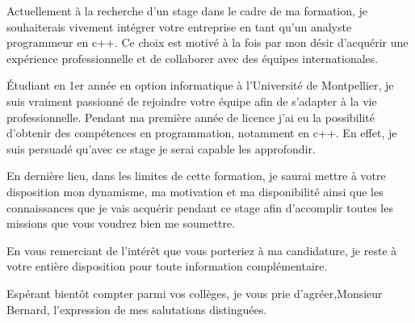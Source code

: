 \documentclass[11pt,a4paper,sans]{moderncv}
\begin{document}
Actuellement à la recherche d’un stage dans le cadre de ma formation, je souhaiterais vivement intégrer votre entreprise en tant qu’un analyste programmeur en c++. Ce choix est motivé à la fois par mon désir d’acquérir une expérience professionnelle et de collaborer avec des équipes internationales. 

Étudiant en 1er année en option informatique à l’Université de Montpellier, je suis vraiment passionné de rejoindre votre équipe afin de s’adapter à la vie professionnelle. Pendant ma première année de licence j’ai eu la possibilité d’obtenir des compétences en programmation, notamment en c++. En effet, je suis persuadé qu’avec ce stage je serai capable les approfondir.

En dernière lieu, dans les limites de cette formation, je saurai mettre à votre disposition mon dynamisme, ma motivation et ma disponibilité ainsi que les connaissances que je vais acquérir pendant ce stage afin d’accomplir toutes les missions que vous voudrez bien me soumettre.

En vous remerciant de l’intérêt que vous porteriez à ma candidature, je reste à votre entière disposition pour toute information complémentaire.

Espérant bientôt compter parmi vos collèges, je vous prie d’agréer,Monsieur Bernard, l’expression de mes salutations distinguées.
\end{document}
